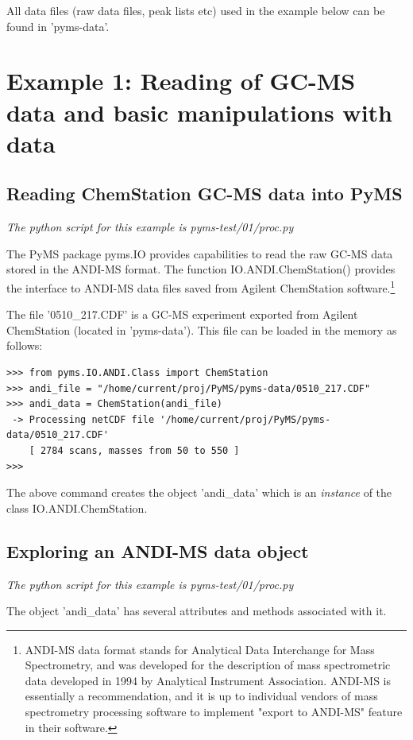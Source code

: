 All data files (raw data files, peak lists etc) used in the example below
can be found in 'pyms-data'.


\section{Example 1: Reading of GC-MS data and basic manipulations with
data}

\subsection{Reading ChemStation GC-MS data into PyMS}

\noindent
{\em The python script for this example is pyms-test/01/proc.py}

The PyMS package pyms.IO provides capabilities to read the raw GC-MS
data stored in the ANDI-MS format. The function IO.ANDI.ChemStation()
provides the interface to ANDI-MS data files saved from Agilent
ChemStation software.\footnote{ANDI-MS data format stands for Analytical
Data Interchange for Mass Spectrometry, and was developed for the
description of mass spectrometric data developed in 1994 by Analytical
Instrument Association. ANDI-MS is essentially a recommendation, and
it is up to individual vendors of mass spectrometry processing software
to implement "export to ANDI-MS" feature in their software.}

The file '0510\_217.CDF' is a GC-MS experiment exported from Agilent
ChemStation (located in 'pyms-data'). This file can be loaded in the
memory as follows:

\begin{verbatim}
>>> from pyms.IO.ANDI.Class import ChemStation
>>> andi_file = "/home/current/proj/PyMS/pyms-data/0510_217.CDF"
>>> andi_data = ChemStation(andi_file)
 -> Processing netCDF file '/home/current/proj/PyMS/pyms-data/0510_217.CDF'
    [ 2784 scans, masses from 50 to 550 ]
>>>
\end{verbatim}

\noindent
The above command creates the object 'andi\_data' which is an {\em instance}
of the class IO.ANDI.ChemStation.

\subsection{Exploring an ANDI-MS data object}

\noindent
{\em The python script for this example is pyms-test/01/proc.py}

The object 'andi\_data' has several attributes and methods associated with it.

